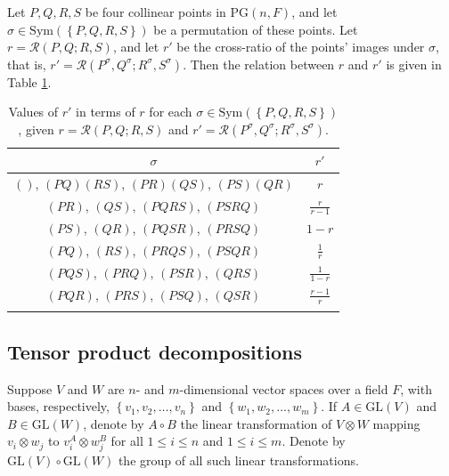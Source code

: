 \documentclass[ALCO, Unicode]{cedram}
\newcommand{\GL}{\mathrm{GL}}
\newcommand{\PG}{\mathrm{PG}}
\newcommand{\Sym}{\mathrm{Sym}}
\begin{document}
\begin{lemma} \label{lm:permute-cross-ratio}
Let $P, Q, R, S$ be four collinear points in $\PG{\left(n, F \right)}$, and let $\sigma \in \Sym{\left(\left\{P, Q, R, S \right\}\right)}$ be a permutation of these points. Let $r = \mathcal{R}{\left(P, Q; R, S \right)}$, and let $r'$ be the cross-ratio of the points' images under $\sigma$, that is, $r' = \mathcal{R}{\left(P^\sigma, Q^\sigma; R^\sigma, S^\sigma \right)}$. Then the relation between $r$ and $r'$ is given in Table \ref{tbl:permuted-cross-ratios}.
\end{lemma}

\begin{table}
\renewcommand*{\arraystretch}{1.6}
\centering
\begin{tabular}{cc}
\hline
$\sigma$ & $r'$ \\
\hline
$\left(\right)$, ${\left(PQ \right)} {\left(RS \right)}$, ${\left(PR \right)} {\left(QS \right)}$, ${\left(PS \right)} {\left(QR \right)}$ & $r$ \\
$\left(PR \right)$, $\left(QS \right)$, $\left(PQRS \right)$, $\left(PSRQ \right)$ & $\frac{r}{r-1}$ \\
$\left(PS \right)$, $\left(QR \right)$, $\left(PQSR \right)$, $\left(PRSQ \right)$ & $1-r$ \\
$\left(PQ \right)$, $\left(RS \right)$, $\left(PRQS \right)$, $\left(PSQR \right)$ & $\frac{1}{r}$ \\
$\left(PQS \right)$, $\left(PRQ \right)$, $\left(PSR \right)$, $\left(QRS \right)$ & $\frac{1}{1-r}$ \\
$\left(PQR \right)$, $\left(PRS \right)$, $\left(PSQ \right)$, $\left(QSR \right)$ & $\frac{r-1}{r}$ \\
\hline \\
\end{tabular}
\caption{Values of $r'$ in terms of $r$ for each $\sigma \in \Sym{\left(\left\{P, Q, R, S \right\}\right)}$, given $r = \mathcal{R}{\left(P, Q; R, S \right)}$ and $r' = \mathcal{R}{\left(P^\sigma, Q^\sigma; R^\sigma, S^\sigma \right)}$.}
\label{tbl:permuted-cross-ratios}
\end{table}

\subsection{Tensor product decompositions}

Suppose $V$ and $W$ are $n$- and $m$-dimensional vector spaces over a field $F$, with bases, respectively, $\left\{v_1, v_2, \ldots, v_n \right\}$ and $\left\{w_1, w_2, \ldots, w_m \right\}$. If $A \in \GL{\left(V \right)}$ and $B \in \GL{\left(W \right)}$, denote by $A \circ B$ the linear transformation of $V \otimes W$ mapping $v_i \otimes w_j$ to $v_i^A \otimes w_j^B$ for all $1 \leqslant i \leqslant n$ and $1 \leqslant i \leqslant m$. Denote by $\GL{\left(V \right)} \circ \GL{\left(W \right)}$ the group of all such linear transformations.
\end{document}
